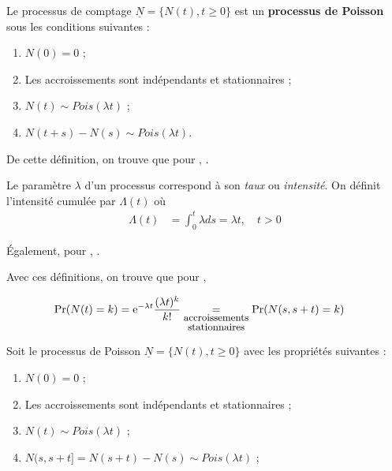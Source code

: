 \documentclass[10pt, french]{article}
\begin{document}
\begin{multicols*}{2}
\begin{definitionNOHFILL}
Le processus de comptage $\underline{N}	=	\{N(t), t \geq 0\}$ est un \textbf{processus de Poisson} sous les conditions suivantes :
\begin{enumerate}[label = \circled{\arabic*}{trueblue}]
	\item	$N(0)	=	0$ ;
	\item	Les accroissements sont indépendants et stationnaires ;
	\item	$N(t)	\sim	Pois(\lambda t)$ ;
	\item	$N(t + s) - N(s) \sim Pois(\lambda t)$.
\end{enumerate}

\bigskip

De cette définition, on trouve que pour , \lfbox[formula]{$N(s, s + t]	=	N(s + t)	-	N(s)$}.
\end{definitionNOHFILL}

\begin{definitionNOHFILLsub}
Le paramètre $\lambda$ d'un processus correspond à son \textit{taux} ou \textit{intensité}. On définit l'intensité cumulée par $\Lambda(t)$ où 
\begin{align*}
\Lambda(t)
	&=	\int_{0}^{t} \lambda ds
	=	\lambda t, \quad t > 0
\end{align*}

\bigskip

Également, pour , \lfbox[formula]{$\Lambda(s, s + t]	=	\Lambda(s + t)	-	\Lambda(s)$}.
\end{definitionNOHFILLsub}

\bigskip

Avec ces définitions, on trouve que pour , 

\begin{align*}
	\Pr(N(t)	=	k)
	&=	\textrm{e}^{-\lambda t} \frac{(\lambda t)^{k}}{k!}	
	\underset{\small\shortstack{accroissements\\ stationnaires}}{=} \Pr(N(s, s + t)	=	k)
\end{align*}

\bigskip

\begin{definitionNOHFILLprop}
Soit le processus de Poisson $\underline{N}	=	\{N(t), t \geq 0\}$ avec les propriétés suivantes :
\begin{enumerate}[label = \rectangled{\arabic*}{lightgray}]
	\item	$N(0)	=	0$ ;
	\item	Les accroissements sont indépendants et stationnaires ;
	\item	$N(t)	\sim	Pois(\lambda t)$ ;
	\item	$N(s, s + t]	= N(s + t) - N(s) \sim Pois(\lambda t)$ ;
\end{enumerate}


\end{definitionNOHFILLprop}
\end{multicols*}
\end{document}
